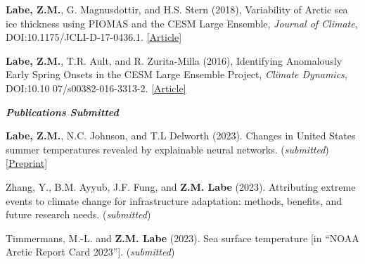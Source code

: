 \documentclass[margin,line,palatino,courier,10pt]{res}
\begin{document}
\begin{resume}
\begin{etaremune}[leftmargin=0in,topsep=0in,parsep=0in]
\item \textbf{Labe, Z.M.}, G. Magnusdottir, and H.S. Stern (2018), Variability of Arctic sea ice thickness using PIOMAS and the CESM Large Ensemble, \textit{Journal of Climate}, DOI:10.1175/JCLI-D-17-0436.1. \href{https://journals.ametsoc.org/doi/abs/10.1175/JCLI-D-17-0436.1}{[Article]}
\item \textbf{Labe, Z.M.}, T.R. Ault, and R. Zurita-Milla (2016), Identifying Anomalously Early Spring Onsets in the CESM Large Ensemble Project, \textit{Climate Dynamics}, DOI:10.10 07/s00382-016-3313-2. \href{http://link.springer.com/article/10.1007/s00382-016-3313-2}{[Article]}
\end{etaremune}

\textit{\textbf{Publications Submitted}}
\vspace*{-0.1in}\\
\begin{etaremune}[leftmargin=0in,topsep=0in,parsep=0in]
\item \textbf{Labe, Z.M.}, N.C. Johnson, and T.L Delworth (2023). Changes in United States summer temperatures revealed by explainable neural networks. (\textit{submitted}) \href{https://doi.org/10.22541/essoar.168987129.98069596/v1}{[Preprint]}
\item Zhang, Y., B.M. Ayyub, J.F. Fung, and \textbf{Z.M. Labe} (2023). Attributing extreme events to climate change for infrastructure adaptation: methods, benefits, and future research needs. (\textit{submitted})
\item Timmermans, M.-L. and \textbf{Z.M. Labe} (2023). Sea surface temperature [in ``NOAA Arctic Report Card 2023'']. (\textit{submitted})
\end{etaremune}


\end{resume}
\end{document}
